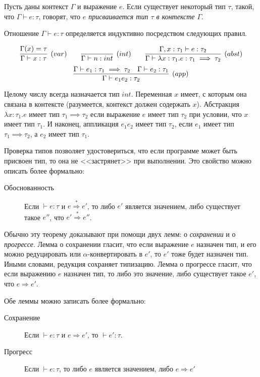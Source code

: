 Пусть даны контекст $\Gamma$ и выражение $e$. Если существует некоторый тип $\tau$, такой, что $\Gamma \vdash e:\tau$, говорят, что \emph{$e$ присваивается тип $\tau$ в контексте $\Gamma$}.

Отношение $\Gamma \vdash e:\tau$ определяется индуктивно посредством следующих правил.

$$
\infer[(var)]{\Gamma \vdash x:\tau}{\Gamma (x) = \tau}
\qquad \infer[(int)]{\Gamma \vdash n:int}{}
\qquad \infer[(abst)]
  {\Gamma \vdash \lambda x:\tau_1 . e : \tau_1 \implies \tau_2}
  {\Gamma,x:\tau_1 \vdash e:\tau_2}
$$
$$
\infer[(app)]
  {\Gamma \vdash e_1 e_2 : \tau_2}
  {\Gamma \vdash e_1:\tau_1 \implies \tau_2 & \Gamma \vdash e_2:\tau_1}
$$

Целому числу всегда назначается тип $int$. Переменная $x$ имеет, с которым она связана в контексте (разумеется, контекст должен содержать $x$). Абстракция $\lambda x: \tau_1 . e$ имеет тип $\tau_1 \implies \tau_2$ если выражение $e$ имеет тип $\tau_2$ при условии, что $x$ имеет тип $\tau_1$. И наконец, аппликация $e_1 e_2$ имеет тип $\tau_2$, если $e_1$ имеет тип $\tau_1 \implies \tau_2$, а $e_2$ имеет тип $\tau_1$.

Проверка типов позволяет удостовериться, что если программе может быть присвоен тип, то она не <<застрянет>> при выполнении. Это свойство можно описать более формально:
\begin{description}
  \item[Обоснованность] Если $\vdash e:\tau$ и $e \overset{\ast}{\Rightarrow} e'$, то либо $e'$ является значением, либо существует такое $e''$, что $e' \overset{\ast}{\Rightarrow} e''$.
\end{description}

Обычно эту теорему доказывают при помощи двух лемм: о \emph{сохранении} и о \emph{прогрессе}. Лемма о сохранении гласит, что если выражение $e$ назначен тип, и его можно редуцировать или $\alpha$-конвертировать в $e'$, то $e'$ тоже будет назначен тип. Иными словами, редукция сохраняет типизацию. Лемма о прогрессе гласит, что если выражению $e$ назначен тип, то либо это значение, либо существует такое $e'$, что $e \Rightarrow e'$.

Обе леммы можно записать более формально:
\begin{description}
\item[Сохранение] Если $\vdash e:\tau$ и $e \Rightarrow e'$, то $\vdash e':\tau$.
\item[Прогресс] Если $\vdash e:\tau$, то либо $e$ является значением, либо $e \Rightarrow e'$
\end{description}


